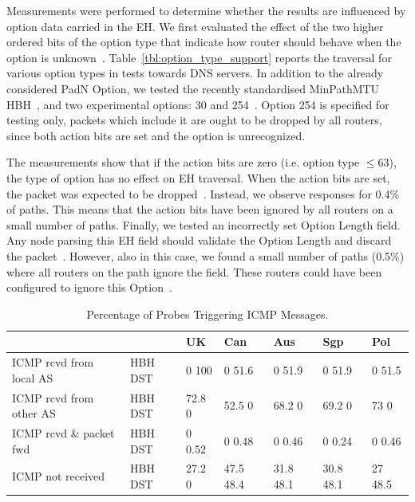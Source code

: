 \documentclass[conference]{IEEEtran}
\begin{document}
Measurements were performed to determine whether the results are 
influenced by option data carried in the EH.  We first
evaluated the effect of the two higher ordered bits of the option type
that indicate how router should behave when the option is unknown~\cite{rfc8200}.
Table~\ref{tbl:option_type_support} reports the traversal for various
option types in tests towards DNS servers.  In addition to the already
considered PadN Option, we tested the recently standardised MinPathMTU
HBH~\cite{rfc9268}, and two experimental options: 30 and
254~\cite{RFC4727}. Option 254 is specified for testing
only, packets which include it are ought to be dropped by all routers, since both action bits are set and the option is unrecognized.

The measurements show that if the action bits are zero (i.e. option type
$\le 63$), the type of option has no effect on EH traversal. When the action bits are set, the
packet was expected to be dropped~\cite{rfc8200}.  Instead, we observe
responses for 0.4\% of paths. This means that the action bits have been ignored by all
routers on a small number of paths.
Finally, we tested an incorrectly set Option Length field. Any node parsing
this EH field should validate the Option Length and discard the
packet~\cite{rfc8200}. However, also in this case, we found a small number of
paths (0.5\%) where all routers on the path ignore the field. These routers could have been configured to ignore this Option~\cite{rfc8200}.

\begin{table}[t]
\centering
\caption{Percentage of Probes Triggering ICMP Messages.}
\label{tbl:icmp_support_dst}
\begin{tabular}{p{}|p{}|
p{}|p{}|p{}|p{}|p{}}
                           &          & UK        & Can       & Aus    & Sgp          & Pol     \\
\hline
\hline
{ICMP rcvd from local AS}  & {HBH DST} & {0 100}  & {0 51.6}    & {0 51.9}    & {0 51.9}    & {0 51.5}  \\
\hline
{ICMP rcvd from other AS} & {HBH DST} & {72.8 0} & {52.5 0}    & {68.2 0}    & {69.2 0}    & {73  0}   \\
\hline
{ICMP rcvd \& packet fwd} & {HBH DST} & {0 0.52} & {0 0.48}    & {0 0.46}    & {0 0.24}    & {0 0.46}  \\
\hline
{ICMP not received}        & {HBH DST} & {27.2 0} & {47.5 48.4} & {31.8 48.1} & {30.8 48.1} & {27 48.5} 
\end{tabular}
\end{table}
\end{document}

